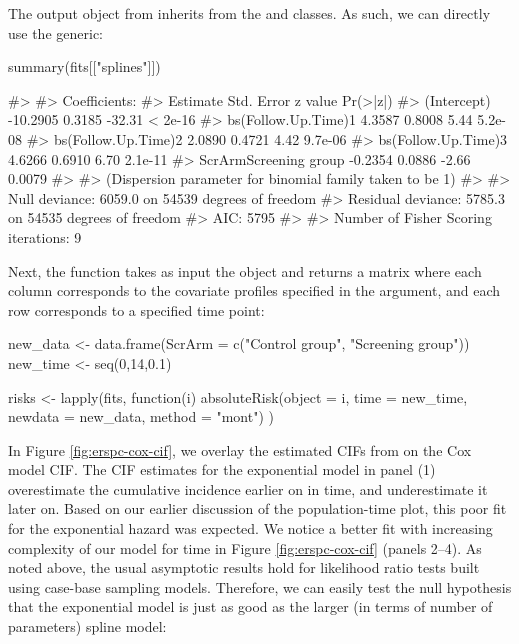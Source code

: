 The output object from  inherits from the
 and  classes. As such, we can directly
use the  generic:

\begin{Schunk}
\begin{Sinput}
summary(fits[["splines"]]) 
\end{Sinput}
\end{Schunk}

\begin{Schunk}
\begin{Soutput}
#> 
#> Coefficients:
#>                       Estimate Std. Error z value Pr(>|z|)
#> (Intercept)           -10.2905     0.3185  -32.31  < 2e-16
#> bs(Follow.Up.Time)1     4.3587     0.8008    5.44  5.2e-08
#> bs(Follow.Up.Time)2     2.0890     0.4721    4.42  9.7e-06
#> bs(Follow.Up.Time)3     4.6266     0.6910    6.70  2.1e-11
#> ScrArmScreening group  -0.2354     0.0886   -2.66   0.0079
#> 
#> (Dispersion parameter for binomial family taken to be 1)
#> 
#>     Null deviance: 6059.0  on 54539  degrees of freedom
#> Residual deviance: 5785.3  on 54535  degrees of freedom
#> AIC: 5795
#> 
#> Number of Fisher Scoring iterations: 9
\end{Soutput}
\end{Schunk}

Next, the  function takes as input the
 object and returns a matrix where each column
corresponds to the covariate profiles specified in the 
argument, and each row corresponds to a specified time point:

\begin{Schunk}
\begin{Sinput}
new_data <- data.frame(ScrArm = c("Control group", "Screening group"))
new_time <- seq(0,14,0.1)

risks <- lapply(fits, function(i) {
  absoluteRisk(object = i, time = new_time, newdata = new_data, method = "mont")
})
\end{Sinput}
\end{Schunk}

In Figure \ref{fig:erspc-cox-cif}, we overlay the estimated CIFs from
 on the Cox model CIF. The CIF estimates for the
exponential model in panel (1) overestimate the cumulative incidence
earlier on in time, and underestimate it later on. Based on our earlier
discussion of the population-time plot, this poor fit for the
exponential hazard was expected. We notice a better fit with increasing
complexity of our model for time in Figure \ref{fig:erspc-cox-cif}
(panels 2--4). As noted above, the usual asymptotic results hold for
likelihood ratio tests built using case-base sampling models. Therefore,
we can easily test the null hypothesis that the exponential model is
just as good as the larger (in terms of number of parameters) spline
model:

